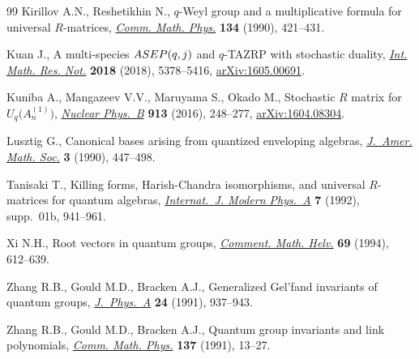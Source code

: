 \documentclass[11pt]{article}
\numberwithin{equation}{section}
\numberwithin{equation}{section}
\begin{document}
\begin{thebibliography}{99}
Kirillov A.N., Reshetikhin N., {$q$}-{W}eyl group and a multiplicative formula
 for universal {$R$}-matrices, \href{https://doi.org/10.1007/BF02097710}{\textit{Comm. Math. Phys.}} \textbf{134} (1990),
 421--431.

Kuan J., A multi-species {${\rm ASEP}(q,j)$} and {$q$}-{TAZRP} with stochastic
 duality, \href{https://doi.org/10.1093/imrn/rnx034}{\textit{Int. Math. Res. Not.}} \textbf{2018} (2018), 5378--5416,
 \href{https://arxiv.org/abs/1605.00691}{arXiv:1605.00691}.

Kuniba A., Mangazeev V.V., Maruyama S., Okado M., Stochastic {$R$} matrix for
 {$U_q\big(A_n^{(1)}\big)$}, \href{https://doi.org/10.1016/j.nuclphysb.2016.09.016}{\textit{Nuclear Phys.~B}} \textbf{913} (2016),
 248--277, \href{https://arxiv.org/abs/1604.08304}{arXiv:1604.08304}.

Lusztig G., Canonical bases arising from quantized enveloping algebras,
 \href{https://doi.org/10.2307/1990961}{\textit{J.~Amer. Math. Soc.}} \textbf{3} (1990), 447--498.

Tanisaki T., Killing forms, {H}arish-{C}handra isomorphisms, and universal
 {$R$}-matrices for quantum algebras, \href{https://doi.org/10.1142/s0217751x92004117}{\textit{Internat.~J. Modern Phys.~A}}
 \textbf{7} (1992), supp.~01b, 941--961.

Xi N.H., Root vectors in quantum groups, \href{https://doi.org/10.1007/BF02564506}{\textit{Comment. Math. Helv.}}
 \textbf{69} (1994), 612--639.

Zhang R.B., Gould M.D., Bracken A.J., Generalized {G}el'fand invariants of
 quantum groups, \href{https://dx.doi.org/10.1088/0305-4470/24/5/009}{\textit{J.~Phys.~A}} \textbf{24} (1991), 937--943.

Zhang R.B., Gould M.D., Bracken A.J., Quantum group invariants and link
 polynomials, \href{https://doi.org/10.1007/BF02099115}{\textit{Comm. Math. Phys.}} \textbf{137} (1991), 13--27.

\end{thebibliography}
\end{document}

